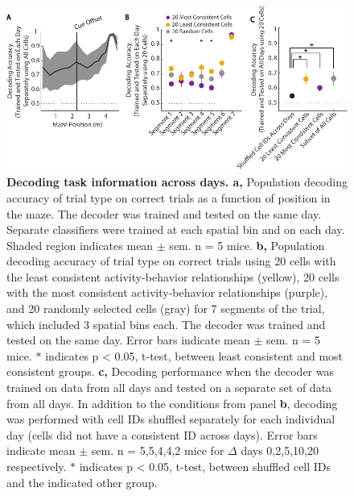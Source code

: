 \begin{figure}
\includegraphics[width=\textwidth]{figures/6_separate_combined.pdf}
\caption[Decoding task information across days.]{\textbf{Decoding task information across days. a,} Population decoding accuracy of trial type on correct trials as a function of position in the maze. The decoder was trained and tested on the same day. Separate classifiers were trained at each spatial bin and on each day. Shaded region indicates mean $\pm$ sem. n = 5 mice.
%
\textbf{b,} Population decoding accuracy of trial type on correct trials using 20 cells with the least consistent activity-behavior relationships (yellow), 20 cells with the most consistent activity-behavior relationships (purple), and 20 randomly selected cells (gray) for 7 segments of the trial, which included 3 spatial bins each. The decoder was trained and tested on the same day. Error bars indicate mean $\pm$ sem. n = 5 mice. $*$ indicates p < 0.05, t-test, between least consistent and most consistent groups. 
%
\textbf{c,} Decoding performance when the decoder was trained on data from all days and tested on a separate set of data from all days. In addition to the conditions from panel \textbf{b}, decoding was performed with cell IDs shuffled separately for each individual day (cells did not have a consistent ID across days). Error bars indicate mean $\pm$ sem. n = 5,5,4,4,2 mice for $\Delta$ days 0,2,5,10,20 respectively.  $*$ indicates p < 0.05, t-test, between shuffled cell IDs and the indicated other group.
\label{fig:decoding}}
\end{figure}

\bigskip

